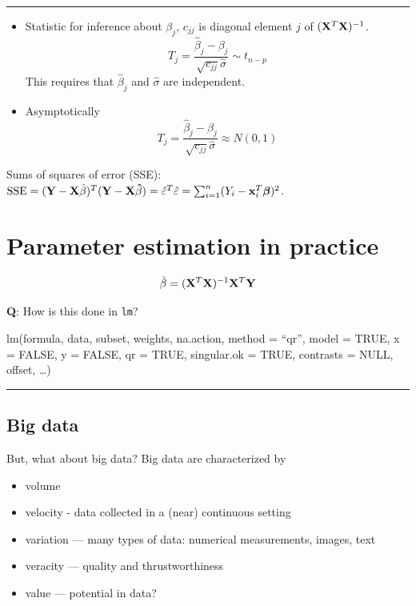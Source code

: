 \documentclass[
]{article}
\providecommand{\tightlist}{%
  \setlength{\itemsep}{0pt}\setlength{\parskip}{0pt}}
\begin{document}
\begin{center}\rule{0.5\linewidth}{0.5pt}\end{center}

\begin{itemize}
\tightlist
\item
  Statistic for inference about \(\beta_j\), \(c_{jj}\) is diagonal
  element \(j\) of \(({\bf X}^T{\bf X})^{-1}\).
  \[ T_j=\frac{\hat{\beta}_j-\beta_j}{\sqrt{c_{jj}}\hat{\sigma}}\sim t_{n-p}\]
  This requires that \(\hat{\beta}_j\) and \(\hat{\sigma}\) are
  independent.
\item
  Asymptotically
  \[ T_j=\frac{\hat{\beta}_j-\beta_j}{\sqrt{c_{jj}}\hat{\sigma}}\approx N(0,1)\]
\end{itemize}

Sums of squares of error (SSE):
\(\text{SSE}=({\bf Y}-{\bf X}{\hat{\beta}})^T({\bf Y}-{\bf X}{\bf \hat{\beta}})=\hat{\varepsilon}^T \hat{\varepsilon}=\sum_{i=1}^n(Y_i-{\bf x}_i^T\boldsymbol{\beta})^2\).

\hypertarget{parameter-estimation-in-practice}{%
\section{Parameter estimation in
practice}\label{parameter-estimation-in-practice}}

\[ \hat\beta=({\bf X}^T{\bf X})^{-1} {\bf X}^T {\bf Y}\]

\textbf{Q}: How is this done in \texttt{lm}?

lm(formula, data, subset, weights, na.action, method = ``qr'', model =
TRUE, x = FALSE, y = FALSE, qr = TRUE, singular.ok = TRUE, contrasts =
NULL, offset, \ldots)

\begin{center}\rule{0.5\linewidth}{0.5pt}\end{center}

\hypertarget{big-data}{%
\subsection{Big data}\label{big-data}}

But, what about big data? Big data are characterized by

\begin{itemize}
\tightlist
\item
  volume
\item
  velocity - data collected in a (near) continuous setting
\item
  variation --- many types of data: numerical measurements, images, text
\item
  veracity --- quality and thrustworthiness
\item
  value --- potential in data?
\end{itemize}
\end{document}
